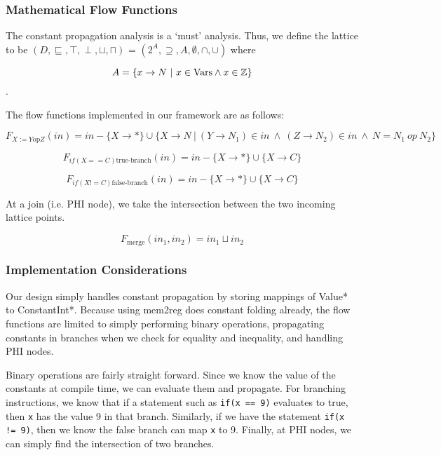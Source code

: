 \documentclass{article}
\theoremstyle{definition}
\begin{document}
\subsubsection{Mathematical Flow Functions}

The constant propagation analysis is a `must' analysis. Thus, we define the lattice to be $(D, \sqsubseteq, \top, \perp, \sqcup, \sqcap)$ = $(2^A, \supseteq, A, \emptyset, \cap, \cup)$ where

\[ A = \{x \rightarrow N~|~x \in \textup{Vars} \wedge x \in \mathbb{Z}\} \].

The flow functions implemented in our framework are as follows:

\[ F_{X:= Y \text{op} Z}(in) = in - \{X \rightarrow \ast\} \cup \{ X \rightarrow N~|~(Y \rightarrow N_1) \in in~\wedge ~(Z \rightarrow N_2) \in in~\wedge ~N = N_1~op~N_2 \} \]

\[ F_{if(X == C) \text{true-branch}}(in) = in - \{X \rightarrow \ast\} \cup \{ X \rightarrow C \} \]

\[ F_{if(X != C) \text{false-branch}}(in) = in - \{X \rightarrow \ast\} \cup \{ X \rightarrow C \} \]

At a join (i.e. PHI node), we take the intersection between the two incoming lattice points.

\[ F_{\text{merge}}(in_1, in_2) = in_1 \sqcup in_2 \]

\subsubsection{Implementation Considerations}

Our design simply handles constant propagation by storing mappings of Value* to ConstantInt*. Because using mem2reg does constant folding already, the flow functions are limited to simply performing binary operations, propagating constants in branches when we check for equality and inequality, and handling PHI nodes.

Binary operations are fairly straight forward. Since we know the value of the constants at compile time, we can evaluate them and propagate. For branching instructions, we know that if a statement such as \verb|if(x == 9)| evaluates to true, then \verb|x| has the value 9 in that branch. Similarly, if we have the statement \verb|if(x != 9)|, then we know the false branch can map \verb|x| to 9. Finally, at PHI nodes, we can simply find the intersection of two branches.
\end{document}
